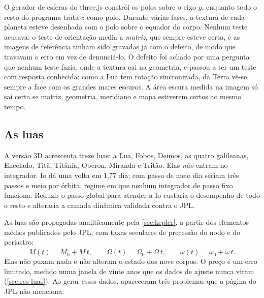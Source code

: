 \begin{licao}
O gerador de esferas do three.js constrói os polos sobre o eixo $y$, enquanto todo o resto do programa trata $z$ como polo. Durante várias fases, a textura de cada planeta esteve desenhada com o polo sobre o equador do corpo. Nenhum teste acusava: o teste de orientação media a \emph{matriz}, que sempre esteve certa, e as imagens de referência tinham sido gravadas já com o defeito, de modo que travavam o erro em vez de denunciá-lo. O defeito foi achado por uma pergunta que nenhum teste fazia, onde a textura cai na geometria, e passou a ter um teste com resposta conhecida: como a Lua tem rotação sincronizada, da Terra vê-se sempre a face com os grandes mares escuros. A área escura medida na imagem só sai certa se matriz, geometria, meridiano e mapa estiverem certos ao mesmo tempo.
\end{licao}

\subsection{As luas}\label{sec:luas}

A versão 3D acrescenta treze luas: a Lua, Fobos, Deimos, as quatro galileanas, Encélado, Titã, Titânia, Oberon, Miranda e Tritão. Elas \emph{não} entram no integrador. Io dá uma volta em 1,77 dia; com passo de meio dia seriam três passos e meio por órbita, regime em que nenhum integrador de passo fixo funciona. Reduzir o passo global para atender a Io custaria o desempenho de todo o resto e alteraria a camada dinâmica validada contra o JPL.

As luas são propagadas analiticamente pela \autoref{sec:kepler}, a partir dos elementos médios publicados pelo JPL, com taxas seculares de precessão do nodo e do periastro:
\begin{equation}
  M(t) = M_0 + \dot M\,t,\qquad
  \Omega(t) = \Omega_0 + \dot\Omega\,t,\qquad
  \omega(t) = \omega_0 + \dot\omega\,t.
\end{equation}
Elas não puxam nada e não alteram o estado dos nove corpos. O preço é um erro limitado, medido numa janela de vinte anos que os dados de ajuste nunca viram (\autoref{sec:res-luas}). Ao gerar esses dados, apareceram três problemas que a página do JPL não menciona:

